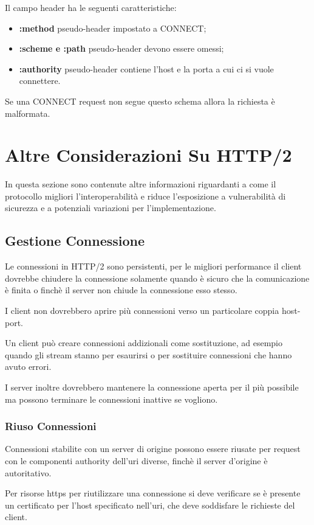 \documentclass[12pt, a4paper]{article} %
\begin{document}
Il campo header ha le seguenti caratteristiche:
\begin{itemize}
  \item \textbf{:method} pseudo-header impostato a CONNECT;
  \item \textbf{:scheme e :path} pseudo-header devono essere omessi;
  \item \textbf{:authority} pseudo-header contiene l'host e la porta a cui ci si vuole connettere.
\end{itemize}

Se una CONNECT request non segue questo schema allora la richiesta è malformata.

\section{Altre Considerazioni Su HTTP/2}
In questa sezione sono contenute altre informazioni riguardanti a come il protocollo migliori l'interoperabilità e riduce l'esposizione a vulnerabilità di sicurezza e a potenziali variazioni per l'implementazione.

\subsection{Gestione Connessione}
Le connessioni in HTTP/2 sono persistenti, per le migliori performance il client dovrebbe chiudere la connessione solamente quando è sicuro che la comunicazione è finita o finchè il server non chiude la connessione esso stesso.

I client non dovrebbero aprire più connessioni verso un particolare coppia host-port.

Un client può creare connessioni addizionali come sostituzione, ad esempio quando gli stream stanno per esaurirsi o per sostituire connessioni che hanno avuto errori.

I server inoltre dovrebbero mantenere la connessione aperta per il più possibile ma possono terminare le connessioni inattive se vogliono.

\subsubsection{Riuso Connessioni}
Connessioni stabilite con un server di origine possono essere riusate per request con le componenti authority dell'uri diverse, finchè il server d'origine è autoritativo.

Per risorse https per riutilizzare una connessione si deve verificare se è presente un certificato per l'host specificato nell'uri, che deve soddisfare le richieste del client.
\end{document}
